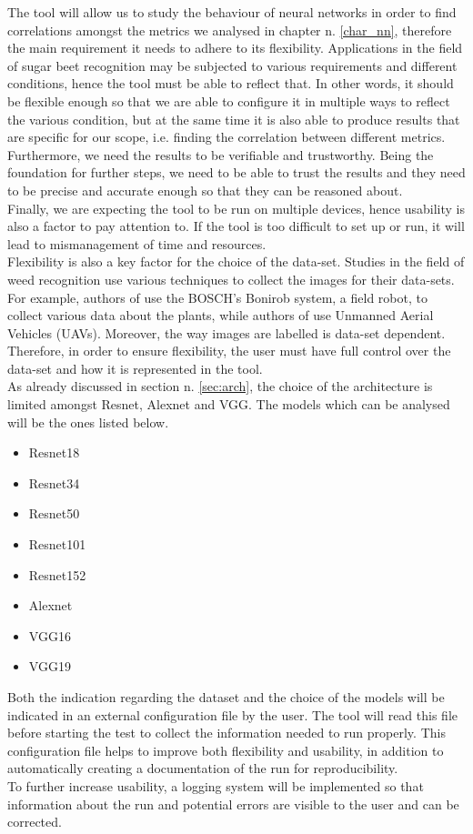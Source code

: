 The tool will allow us to study the behaviour of neural networks in order to find correlations amongst the metrics we analysed in chapter n. \ref{char_nn}, therefore the main requirement it needs to adhere to its flexibility. Applications in the field of sugar beet recognition may be subjected to various requirements and different conditions, hence the tool must be able to reflect that. In other words, it should be flexible enough so that we are able to configure it in multiple ways to reflect the various condition, but at the same time it is also able to produce results that are specific for our scope, i.e. finding the correlation between different metrics. Furthermore, we need the results to be verifiable and trustworthy. Being the foundation for further steps, we need to be able to trust the results and they need to be precise and accurate enough so that they can be reasoned about. \\
Finally, we are expecting the tool to be run on multiple devices, hence usability is also a factor to pay attention to. If the tool is too difficult to set up or run, it will lead to mismanagement of time and resources. \\
Flexibility is also a key factor for the choice of the data-set. Studies in the field of weed recognition use various techniques to collect the images for their data-sets. For example, authors of \cite{lu_survey_2020} use the BOSCH’s Bonirob system, a field robot, to collect various data about the plants, while authors of \cite{rs10111690} use Unmanned Aerial Vehicles (UAVs). Moreover, the way images are labelled is data-set dependent. 
Therefore, in order to ensure flexibility, the user must have full control over the data-set and how it is represented in the tool. \\
As already discussed in section n. \ref{sec:arch},  the choice of the architecture is limited amongst Resnet, Alexnet and VGG. The models which can be analysed will be the ones listed below. 
\begin{itemize}
\item Resnet18
\item Resnet34
\item Resnet50
\item Resnet101
\item Resnet152
\item Alexnet
\item VGG16
\item VGG19
\end{itemize}
Both the indication regarding the dataset and the choice of the models will be indicated in an external configuration file by the user. The tool will read this file before starting the test to collect the information needed to run properly. This configuration file helps to improve both flexibility and usability, in addition to automatically creating a documentation of the run for reproducibility. \\
To further increase usability, a logging system will be implemented so that information about the run and potential errors are visible to the user and can be corrected. \\

